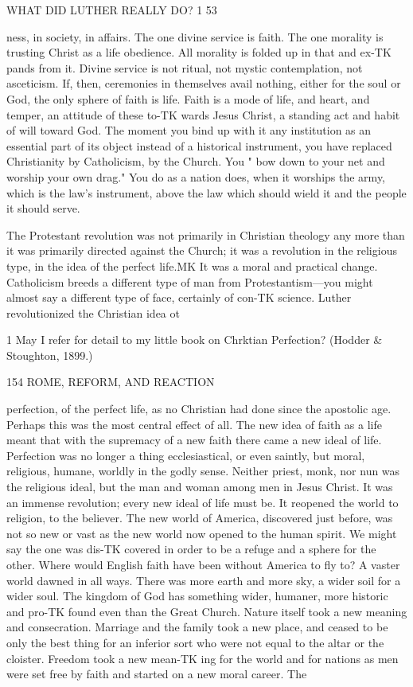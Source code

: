 \documentclass[12pt,a5paper,oneside]{book}
\begin{document}
{WHAT DID LUTHER REALLY DO? 1 53 

ness, in society, in affairs. The one divine service is 
faith. The one morality is trusting Christ as a life 
obedience. All morality is folded up in that and ex-TK
pands from it. Divine service is not ritual, not mystic 
contemplation, not asceticism. If, then, ceremonies 
in themselves avail nothing, either for the soul or God, 
the only sphere of faith is life. Faith is a mode of 
life, and heart, and temper, an attitude of these to-TK
wards Jesus Christ, a standing act and habit of will 
toward God. The moment you bind up with it any 
institution as an essential part of its object instead of 
a historical instrument, you have replaced Christianity 
by Catholicism, by the Church. You " bow down to 
your net and worship your own drag." You do as a 
nation does, when it worships the army, which is the 
law's instrument, above the law which should wield it 
and the people it should serve. 

The Protestant revolution was not primarily in 
Christian theology any more than it was primarily 
directed against the Church; it was a revolution in 
the religious type, in the idea of the perfect life.MK It 
was a moral and practical change. Catholicism breeds 
a different type of man from Protestantism---you might 
almost say a different type of face, certainly of con-TK
science. Luther revolutionized the Christian idea ot 

1 May I refer for detail to my little book on Chrktian Perfection? 
(Hodder \& Stoughton, 1899.) 



154 ROME, REFORM, AND REACTION 

perfection, of the perfect life, as no Christian had done 
since the apostolic age. Perhaps this was the most 
central effect of all. The new idea of faith as a life 
meant that with the supremacy of a new faith there 
came a new ideal of life. Perfection was no longer a 
thing ecclesiastical, or even saintly, but moral, religious, 
humane, worldly in the godly sense. Neither priest, 
monk, nor nun was the religious ideal, but the man 
and woman among men in Jesus Christ. It was an 
immense revolution; every new ideal of life must be. 
It reopened the world to religion, to the believer. 
The new world of America, discovered just before, 
was not so new or vast as the new world now opened 
to the human spirit. We might say the one was dis-TK
covered in order to be a refuge and a sphere for the 
other. Where would English faith have been without 
America to fly to? A vaster world dawned in all 
ways. There was more earth and more sky, a wider 
soil for a wider soul. The kingdom of God has 
something wider, humaner, more historic and pro-TK
found even than the Great Church. Nature itself took 
a new meaning and consecration. Marriage and the 
family took a new place, and ceased to be only the 
best thing for an inferior sort who were not equal to 
the altar or the cloister. Freedom took a new mean-TK
ing for the world and for nations as men were set free 
by faith and started on a new moral career. The 



}
\end{document}
